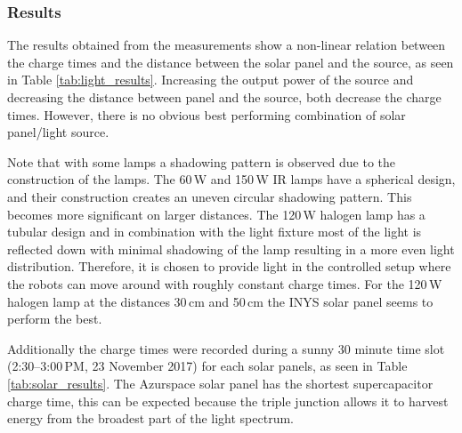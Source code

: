 \subsubsection{Results}

The results obtained from the measurements show a non-linear relation between the charge times and the distance between the solar panel and the source, as seen in Table \ref{tab:light_results}.
Increasing the output power of the source and decreasing the distance between panel and the source, both decrease the charge times.
However, there is no obvious best performing combination of solar panel/light source.

Note that with some lamps a shadowing pattern is observed due to the construction of the lamps.
The 60\,W and 150\,W IR lamps have a spherical design, and their construction creates an uneven circular shadowing pattern. 
This becomes more significant on larger distances.
The 120\,W halogen lamp has a tubular design and in combination with the light fixture most of the light is reflected down with minimal shadowing of the lamp resulting in a more even light distribution.
Therefore, it is chosen to provide light in the controlled setup where the robots can move around with roughly constant charge times.
For the 120\,W halogen lamp at the distances 30\,cm and 50\,cm the INYS solar panel seems to perform the best.

Additionally the charge times were recorded during a sunny 30 minute time slot (2:30--3:00\,PM, 23 November 2017) for each solar panels, as seen in Table \ref{tab:solar_results}.
The Azurspace solar panel has the shortest supercapacitor charge time, this can be expected because the triple junction allows it to harvest energy from the broadest part of the light spectrum.


